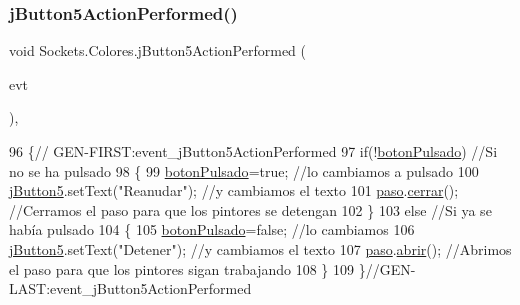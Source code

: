 \mbox{\label{class_sockets_1_1_colores_a02b7b95d6d82af2a358d2d6a358a742b}} 
\subsubsection{\texorpdfstring{j\+Button5\+Action\+Performed()}{jButton5ActionPerformed()}}
{\footnotesize\ttfamily void Sockets.\+Colores.\+j\+Button5\+Action\+Performed (\begin{DoxyParamCaption}\item[{java.\+awt.\+event.\+Action\+Event}]{evt }\end{DoxyParamCaption})\hspace{0.3cm}{\ttfamily [inline]}, {\ttfamily [private]}}


\begin{DoxyCode}
96                                                                          \{\textcolor{comment}{//
      GEN-FIRST:event\_jButton5ActionPerformed}
97         \textcolor{keywordflow}{if}(!\mbox{\hyperlink{class_sockets_1_1_colores_ab9176a60b5bc0b70d94a23d9c1a448cd}{botonPulsado}}) \textcolor{comment}{//Si no se ha pulsado}
98         \{                 
99             \mbox{\hyperlink{class_sockets_1_1_colores_ab9176a60b5bc0b70d94a23d9c1a448cd}{botonPulsado}}=\textcolor{keyword}{true};             \textcolor{comment}{//lo cambiamos a pulsado}
100             \mbox{\hyperlink{class_sockets_1_1_colores_a4cacc03eb161c98ee51cfdd6970ecd35}{jButton5}}.setText(\textcolor{stringliteral}{"Reanudar"});  \textcolor{comment}{//y cambiamos el texto}
101             \mbox{\hyperlink{class_sockets_1_1_colores_adf9fafb3fd2b7cdd9e555b80d94df744}{paso}}.\mbox{\hyperlink{class_sockets_1_1_paso_a56e0e78be832edf53d6cbc29b095ac71}{cerrar}}();    \textcolor{comment}{//Cerramos el paso para que los pintores se detengan}
102         \}
103         \textcolor{keywordflow}{else} \textcolor{comment}{//Si ya se había pulsado}
104         \{                           
105             \mbox{\hyperlink{class_sockets_1_1_colores_ab9176a60b5bc0b70d94a23d9c1a448cd}{botonPulsado}}=\textcolor{keyword}{false};            \textcolor{comment}{//lo cambiamos}
106             \mbox{\hyperlink{class_sockets_1_1_colores_a4cacc03eb161c98ee51cfdd6970ecd35}{jButton5}}.setText(\textcolor{stringliteral}{"Detener"});  \textcolor{comment}{//y cambiamos el texto}
107             \mbox{\hyperlink{class_sockets_1_1_colores_adf9fafb3fd2b7cdd9e555b80d94df744}{paso}}.\mbox{\hyperlink{class_sockets_1_1_paso_ae1faa4c34d81cb9ffaef7ff4bc49eab6}{abrir}}();    \textcolor{comment}{//Abrimos el paso para que los pintores sigan trabajando}
108         \}
109     \}\textcolor{comment}{//GEN-LAST:event\_jButton5ActionPerformed}
\end{DoxyCode}
\mbox{\label{class_sockets_1_1_colores_a0ae8f636007e78298110dbf1dcbedca7}} 
